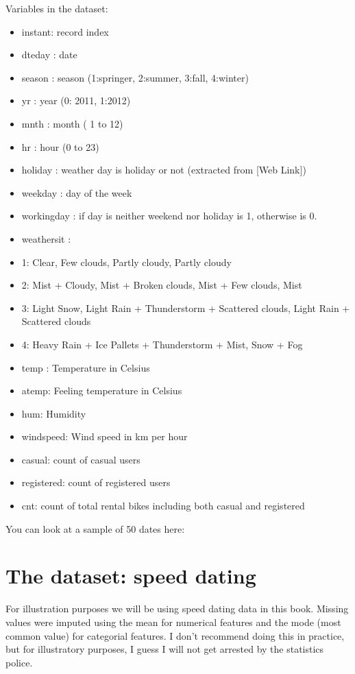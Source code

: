\documentclass[12pt,]{krantz}
\providecommand{\tightlist}{%
  \setlength{\itemsep}{0pt}\setlength{\parskip}{0pt}}
\theoremstyle{definition}
\theoremstyle{definition}
\theoremstyle{definition}
\theoremstyle{remark}
\begin{document}
Variables in the dataset:

\begin{itemize}
\tightlist
\item
  instant: record index
\item
  dteday : date
\item
  season : season (1:springer, 2:summer, 3:fall, 4:winter)
\item
  yr : year (0: 2011, 1:2012)
\item
  mnth : month ( 1 to 12)
\item
  hr : hour (0 to 23)
\item
  holiday : weather day is holiday or not (extracted from {[}Web
  Link{]})
\item
  weekday : day of the week
\item
  workingday : if day is neither weekend nor holiday is 1, otherwise is
  0.
\item
  weathersit :
\item
  1: Clear, Few clouds, Partly cloudy, Partly cloudy
\item
  2: Mist + Cloudy, Mist + Broken clouds, Mist + Few clouds, Mist
\item
  3: Light Snow, Light Rain + Thunderstorm + Scattered clouds, Light
  Rain + Scattered clouds
\item
  4: Heavy Rain + Ice Pallets + Thunderstorm + Mist, Snow + Fog
\item
  temp : Temperature in Celsius
\item
  atemp: Feeling temperature in Celsius
\item
  hum: Humidity
\item
  windspeed: Wind speed in km per hour
\item
  casual: count of casual users
\item
  registered: count of registered users
\item
  cnt: count of total rental bikes including both casual and registered
\end{itemize}

You can look at a sample of 50 dates here:

\hypertarget{htmlwidget-555866c809bfad2b4283}{}

\section{The dataset: speed dating}\label{the-dataset-speed-dating}

For illustration purposes we will be using speed dating data in this
book. Missing values were imputed using the mean for numerical features
and the mode (most common value) for categorial features. I don't
recommend doing this in practice, but for illustratory purposes, I guess
I will not get arrested by the statistics police.
\end{document}
